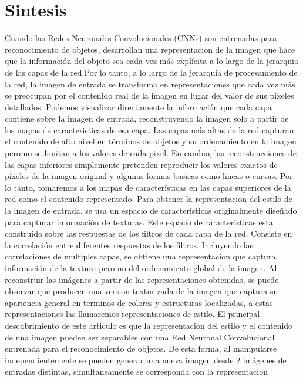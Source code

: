 \documentclass[a4paper,11pt,spanish]{book}
\begin{document}
    \section{Sintesis}
      Cuando las Redes Neuronales Convolucionales (CNNs) son entrenadas para reconocimiento de objetos, desarrollan una representacion de la imagen que hace que la información 
      del objeto sea cada vez más explícita a lo largo de la jerarquia de las capas de la red.Por lo tanto, a lo largo de la jerarquía de procesamiento de la red, 
      la imagen de entrada se transforma en representaciones que cada vez más se preocupan por el contenido real de la imagen en lugar del valor de sus píxeles detallados. 
      Podemos visualizar directamente la información que cada capa contiene sobre la imagen de entrada, reconstruyendo la imagen solo a partir de los mapas de caracteristicas
      de esa capa. Las capas más altas de la red capturan el contenido de alto nivel en términos de objetos y su ordenamiento en la imagen pero no se limitan a los valores de cada 
      pixel. En  cambio, las reconstrucciones de las capas inferiores simplemente pretenden reproducir los valores exactos de píxeles de la imagen original y algunas formas
      basicas como lineas o curvas. Por lo tanto, tomaremos a los mapas de características en las capas superiores de la red como el contenido representado.
      Para obtener la representacion del estilo de la imagen de entrada, se usa un espacio de caracteristicas originalmente diseñado para capturar información de texturas.
      Este espacio de caracteristicas esta construido sobre las respuestas de los filtros de cada capa de la red. Consiste en la correlación entre diferentes respuestas de los filtros.
      Incluyendo las correlaciones de multiples capas, se obtiene una representacion que captura información de la textura pero no del ordenamiento global de la imagen.
      Al reconstruir las imágenes a partir de las representaciones obtenidas, se puede observar que producen una version texturizada de la imagen que captura su 
      apariencia general en terminos de colores y estructuras localizadas, a estas representaciones las llamaremos representaciones de estilo.
      El principal descubrimiento de este articulo es que la representacion del estilo y el contenido de una imagen pueden ser separables con una Red Neuronal Convolucional entrenada 
      para el reconocimiento de objetos. De esta forma, al manipularse independientemente se pueden generar una nueva imagen desde 2 imágenes de entradas distintas, simultaneamente se corresponda con la representacion
\end{document}
